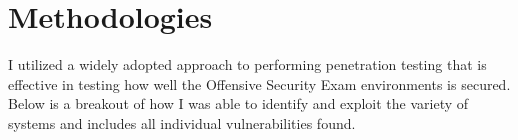 
\chapter{\label{ch:methodologies}Methodologies}
I utilized a widely adopted approach to performing penetration testing that is
effective in testing how well the Offensive Security Exam environments is
secured. Below is a breakout of how I was able to identify and exploit the
variety of systems and includes all individual vulnerabilities found.





